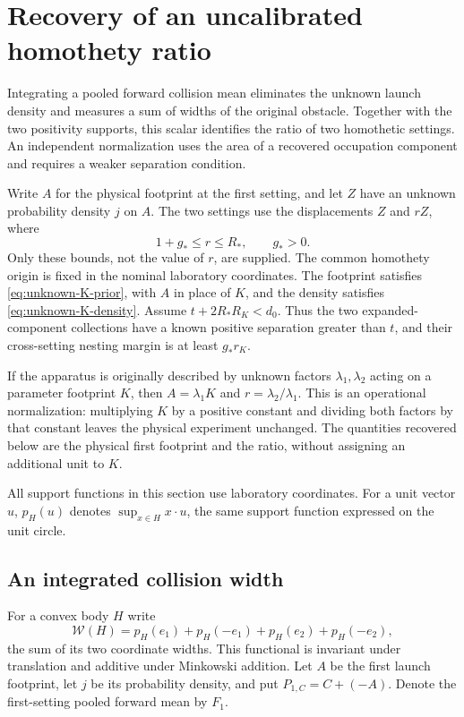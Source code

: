 \section{Recovery of an uncalibrated homothety ratio}
\label{sec:unknown-scale}
Integrating a pooled forward collision mean eliminates the unknown
launch density and measures a sum of widths of the original obstacle.
Together with the two positivity supports, this scalar identifies the
ratio of two homothetic settings. An independent normalization uses
the area of a recovered occupation component and requires a weaker
separation condition.

Write $A$ for the physical footprint at the first setting, and let
$Z$ have an unknown probability density $j$ on $A$. The two settings
use the displacements $Z$ and $rZ$, where
\begin{equation}\label{eq:unk-scale-prior}
             1+g_*\le r\le R_*,\qquad g_*>0.
\end{equation}
Only these bounds, not the value of $r$, are supplied. The common
homothety origin is fixed in the nominal laboratory coordinates.
The footprint satisfies \eqref{eq:unknown-K-prior}, with $A$ in place
of $K$, and the density satisfies \eqref{eq:unknown-K-density}.
Assume $t+2R_*R_K<d_0$. Thus the two expanded-component collections
have a known positive separation greater than $t$, and their
cross-setting nesting margin is at least $g_*r_K$.

If the apparatus is originally described by unknown factors
$\lambda_1,\lambda_2$ acting on a parameter footprint $K$, then
$A=\lambda_1K$ and $r=\lambda_2/\lambda_1$. This is an operational
normalization: multiplying $K$ by a positive constant and dividing
both factors by that constant leaves the physical experiment unchanged.
The quantities recovered below are the physical first footprint and
the ratio, without assigning an additional unit to $K$.

All support functions in this section use laboratory coordinates.
For a unit vector $u$, $p_H(u)$ denotes $\sup_{x\in H}x\cdot u$,
the same support function expressed on the unit circle.

\subsection{An integrated collision width}
For a convex body $H$ write
\[
 \mathcal W(H)=p_H(e_1)+p_H(-e_1)+p_H(e_2)+p_H(-e_2),
\]
the sum of its two coordinate widths. This functional is invariant
under translation and additive under Minkowski addition. Let $A$ be
the first launch footprint, let $j$ be its probability density, and
put $P_{1,C}=C+(-A)$. Denote the first-setting pooled forward mean by
$F_1$.

